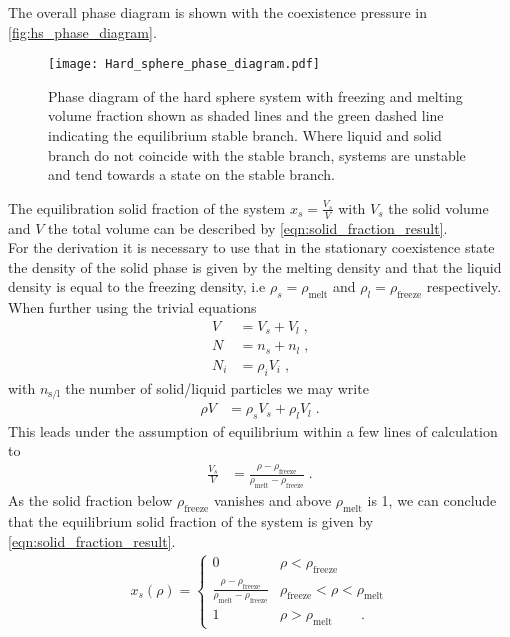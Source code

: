 The overall phase diagram is shown with the coexistence pressure in \autoref{fig:hs_phase_diagram}.\\
\begin{figure}[h]
\centering
\texttt{[image: Hard\_sphere\_phase\_diagram.pdf]}
\caption[Phase diagram of hard sphere fluid]{Phase diagram of the hard sphere system with freezing and melting volume fraction shown as shaded lines and the green dashed line indicating the equilibrium stable branch. Where liquid and solid branch do not coincide with the stable branch, systems are unstable and tend towards a state on the stable branch.}
\label{fig:hs_phase_diagram}
\end{figure}
The equilibration solid fraction of the system $x_s = \frac{V_s}{V}$ with $V_s$ the solid volume and $V$ the total volume can be described by \autoref{eqn:solid_fraction_result}.\\ 
For the derivation it is necessary to use that in the stationary coexistence state the density of the solid phase is given by the melting density and that the liquid density is equal to the freezing density, i.e $\rho_s = \rho_{\text{melt}}$ and $\rho_l = \rho_{\text{freeze}}$ respectively. When further using the trivial equations
\begin{align}
V &= V_s + V_l \; \text{,} \nonumber\\
N &= n_s + n_l \; \text{,} \nonumber\\
N_i &= \rho_i V_i \; \text{,} 
\end{align}
with $n_{\text{s/l}}$ the number of solid/liquid particles we may write
\begin{align}
\rho V &= \rho_s V_s + \rho_l V_l \; \text{.}
\end{align}
This leads under the assumption of equilibrium within a few lines of calculation to 
\begin{align}
\frac{V_s}{V} &= \frac{\rho - \rho_{\text{freeze}}}{\rho_{\text{melt}} - \rho_{\text{freeze}} } \; \text{.}
\end{align}
As the solid fraction below $\rho_{\text{freeze}} $ vanishes and above $\rho_{\text{melt}}$ is 1, we can conclude that the equilibrium solid fraction of the system is given by \autoref{eqn:solid_fraction_result}.
\begin{align}
\label{eqn:solid_fraction_result}
x_s(\rho) = 
\begin{cases}
0 & \rho <  \rho_{\text{freeze}}\\
\frac{\rho-\rho_{\text{freeze}}}{\rho_{\text{melt}}-\rho_{\text{freeze}}} &  \rho_{\text{freeze}} < \rho <  \rho_{\text{melt}}\\ 
1 &  \rho > \rho_{\text{melt}} \quad \quad \text{.}
\end{cases}
\end{align}

